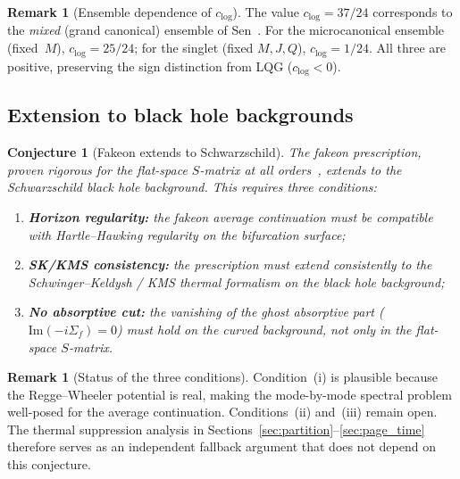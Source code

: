\documentclass[11pt,a4paper]{article}
\theoremstyle{plain}
\newtheorem{conjecture}[theorem]{Conjecture}
\theoremstyle{definition}
\newtheorem{remark}[theorem]{Remark}
\begin{document}
\begin{remark}[Ensemble dependence of $c_{\log}$]%
\label{rem:ensemble}
  The value $c_{\log} = 37/24$ corresponds to the \emph{mixed}
  (grand canonical) ensemble of Sen~\cite{Sen2012}.  For the
  microcanonical ensemble (fixed~$M$), $c_{\log} = 25/24$; for
  the singlet (fixed $M,J,Q$), $c_{\log} = 1/24$.  All three are
  positive, preserving the sign distinction from LQG
  ($c_{\log} < 0$).
\end{remark}

\subsection{Extension to black hole backgrounds}%
\label{sec:fakeon_extension}

\begin{conjecture}[Fakeon extends to Schwarzschild]%
\label{conj:fakeon_schwarzschild}
  The fakeon prescription, proven rigorous for the flat-space
  $S$-matrix at all orders~\cite{AnselmiFakeon}, extends to the
  Schwarzschild black hole background.  This requires three conditions:
  \begin{enumerate}[label=\textup{(\roman*)}]
    \item \textbf{Horizon regularity:} the fakeon average continuation
      must be compatible with Hartle--Hawking regularity on the
      bifurcation surface;
    \item \textbf{SK/KMS consistency:} the prescription must extend
      consistently to the Schwinger--Keldysh / KMS thermal formalism
      on the black hole background;
    \item \textbf{No absorptive cut:} the vanishing of the ghost
      absorptive part ($\mathrm{Im}(-i\Sigma_f) = 0$) must hold on
      the curved background, not only in the flat-space $S$-matrix.
  \end{enumerate}
\end{conjecture}

\begin{remark}[Status of the three conditions]%
\label{rem:three_conditions}
  Condition~(i) is plausible because the Regge--Wheeler potential is
  real, making the mode-by-mode spectral problem well-posed for the
  average continuation.  Conditions~(ii) and~(iii) remain open.
  The thermal suppression analysis in
  Sections~\ref{sec:partition}--\ref{sec:page_time} therefore serves
  as an independent fallback argument that does not depend on this
  conjecture.
\end{remark}
\end{document}
